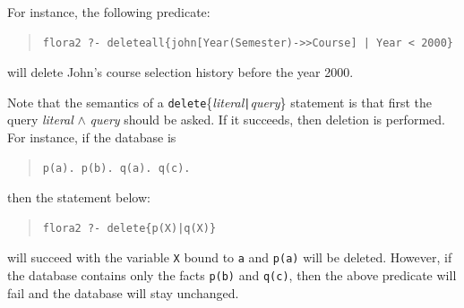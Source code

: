 \documentclass[11pt]{article}
\begin{document}
For instance, the following predicate:
\begin{quote}
\begin{verbatim}
flora2 ?- deleteall{john[Year(Semester)->>Course] | Year < 2000}
\end{verbatim}
\end{quote}
will delete John's course selection history before the year 2000.

Note that the semantics of a {\tt delete}\{\emph{literal}{\tt |}{\it query}\}
statement is that first the query \emph{literal} $\wedge$ \emph{query} should
be asked. If it succeeds, then deletion is performed. For instance, if the
database is
\begin{quote}
\begin{verbatim}
p(a). p(b). q(a). q(c).
\end{verbatim}
\end{quote}
then the statement below:
\begin{quote}
\begin{verbatim}
flora2 ?- delete{p(X)|q(X)}
\end{verbatim}
\end{quote}
will succeed with the variable {\tt X} bound to {\tt a} and {\tt p(a)} will
be deleted.  However, if the database contains only the facts {\tt p(b)}
and {\tt q(c)}, then the above predicate will fail and the database will
stay unchanged.
\end{document}
